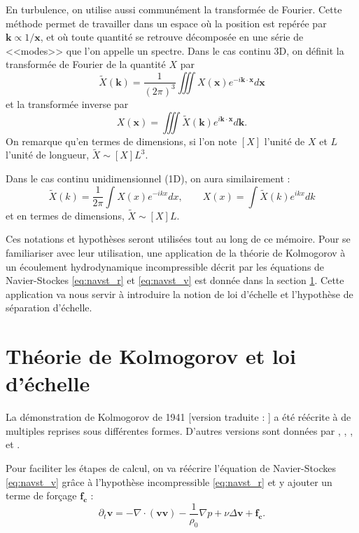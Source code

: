 En turbulence, on utilise aussi communément la transformée de Fourier. Cette méthode permet de travailler dans un espace où la position est repérée par $\boldsymbol{k} \propto 1/\mathbf{x}$, et où toute quantité se retrouve décomposée en une série de <<modes>> que l'on appelle un spectre. Dans le cas continu \acs{3D}, on définit la transformée de Fourier de la quantité $X$ par 
\begin{equation}
    \tilde{X}(\boldsymbol{k}) = \frac{1}{(2\pi)^3} \iiint X(\mathbf{x}) e^{-i\boldsymbol{k} \cdot \mathbf{x}} d\mathbf{x}
\end{equation}
et la transformée inverse par 
\begin{equation}
    X(\mathbf{x}) = \iiint \tilde{X}(\boldsymbol{k}) e^{i\boldsymbol{k} \cdot \mathbf{x}} d\boldsymbol{k}.
\end{equation} 
On remarque qu'en termes de dimensions, si l'on note $[X]$ l'unité de $X$ et $L$ l'unité de longueur, $\tilde{X} \sim [X] L^3$.

Dans le cas continu unidimensionnel (\acs{1D}), on aura similairement : 
\begin{equation}
    \tilde{X}(k) = \frac{1}{2\pi} \int X(x) e^{-ikx} dx , \qquad 
    X(x) = \int \tilde{X}(k) e^{ikx} dk
\end{equation} 
et en termes de dimensions, $\tilde{X} \sim [X] L$.

Ces notations et hypothèses seront utilisées tout au long de ce mémoire. Pour se familiariser avec leur utilisation, une application de la théorie de Kolmogorov à un écoulement hydrodynamique incompressible décrit par les équations de Navier-Stockes \eqref{eq:navst_r} et \eqref{eq:navst_v} est donnée dans la section \ref{sec-013}. Cette application va nous servir à introduire la notion de loi d'échelle et l'hypothèse de séparation d'échelle.


\section{Théorie de Kolmogorov et loi d'échelle}\label{sec-013}

La démonstration de Kolmogorov de 1941 [version traduite :  \cite{kolmogorov_dissipation_1991,kolmogorov_local_1991}] a été réécrite à de multiples reprises sous différentes formes. D'autres versions sont données par \cite{monin_statistical_1975}, \cite{frisch_turbulence_1995}, \cite{antonia_analogy_1997}, et \cite{galtier_physique_2021}. 

Pour faciliter les étapes de calcul, on va réécrire l'équation de Navier-Stockes \eqref{eq:navst_v} grâce à l'hypothèse incompressible \eqref{eq:navst_r} et y ajouter un terme de forçage $\boldsymbol{f_c}$ : 
\begin{equation}
  \label{eq:navst_v2}  \partial_t \boldsymbol{v} = - \nabla \cdot (\boldsymbol{v} \boldsymbol{v}) -  \frac{1}{\rho_0} \nabla p + \nu \Delta \boldsymbol{v} + \boldsymbol{f_c} 
.\end{equation}

